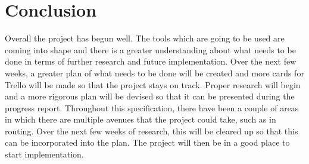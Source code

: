 \documentclass{report}
\begin{document}
\chapter*{Conclusion}

Overall the project has begun well. The tools which are going to be used are coming into shape and there is a greater 
understanding about what needs to be done in terms of further research and future implementation. Over the next few 
weeks, a greater plan of what needs to be done will be created and more cards for Trello will be made so that the 
project stays on track. Proper research will begin and a more rigorous plan will be devised 
so that it can be presented during the progress report. Throughout this specification, there have been a couple of areas 
in which there are multiple avenues that the project could take, such as in routing. Over the next few weeks of 
research, this will be cleared up so that this can be incorporated into the plan. The project will then be in 
a good place to start implementation.


{}

\end{document}
